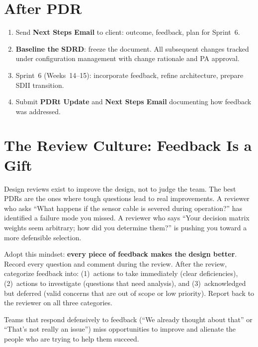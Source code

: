 \section{After PDR}
\begin{enumerate}[nosep,leftmargin=1.5em]
\item Send \textbf{Next Steps Email} to client: outcome, feedback, plan for Sprint~6.
\item \textbf{Baseline the SDRD}: freeze the document. All subsequent changes tracked under configuration management with change rationale and PA approval.
\item Sprint~6 (Weeks~14--15): incorporate feedback, refine architecture, prepare SDII transition.
\item Submit \textbf{PDRt Update} and \textbf{Next Steps Email} documenting how feedback was addressed.
\end{enumerate}

\section{The Review Culture: Feedback Is a Gift}
Design reviews exist to improve the design, not to judge the team. The best PDRs are the ones where tough questions lead to real improvements. A reviewer who asks ``What happens if the sensor cable is severed during operation?'' has identified a failure mode you missed. A reviewer who says ``Your decision matrix weights seem arbitrary; how did you determine them?'' is pushing you toward a more defensible selection.

Adopt this mindset: \textbf{every piece of feedback makes the design better}. Record every question and comment during the review. After the review, categorize feedback into: (1)~actions to take immediately (clear deficiencies), (2)~actions to investigate (questions that need analysis), and (3)~acknowledged but deferred (valid concerns that are out of scope or low priority). Report back to the reviewer on all three categories.

Teams that respond defensively to feedback (``We already thought about that'' or ``That's not really an issue'') miss opportunities to improve and alienate the people who are trying to help them succeed.

